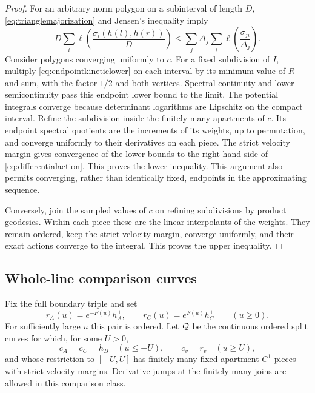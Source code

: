 \begin{proof}
For an arbitrary norm polygon on a subinterval of length $D$,
\eqref{eq:trianglemajorization} and Jensen's inequality imply
\begin{equation}\label{eq:endpointkineticlower}
 D\sum_i\ell\left(\frac{\sigma_i(h(l),h(r))}{D}\right)
 \le\sum_j\Delta_j\sum_i\ell\left(\frac{\sigma_{ji}}{\Delta_j}\right).
\end{equation}
Consider polygons converging uniformly to $c$. For a fixed subdivision
of $I$, multiply \eqref{eq:endpointkineticlower} on each interval by
its minimum value of $R$ and sum, with the factor $1/2$ and both
vertices. Spectral continuity and lower semicontinuity pass this
endpoint lower bound to the limit. The potential integrals converge
because determinant logarithms are Lipschitz on the compact interval.
Refine the subdivision inside the finitely many apartments of $c$.
Its endpoint spectral quotients are the increments of its weights,
up to permutation, and converge uniformly to their derivatives on
each piece. The strict velocity margin gives convergence of the
lower bounds to the right-hand side of \eqref{eq:differentialaction}.
This proves the lower inequality. This argument also permits converging,
rather than identically fixed, endpoints in the approximating sequence.

Conversely, join the sampled values of $c$ on refining subdivisions
by product geodesics. Within each piece these are the linear
interpolants of the weights. They remain ordered, keep the strict
velocity margin, converge uniformly, and their exact actions converge
to the integral. This proves the upper inequality.
\end{proof}

\subsection{Whole-line comparison curves}
Fix the full boundary triple and set
\[
 r_A(u)=e^{-F(u)}h_A^+,\qquad r_C(u)=e^{F(u)}h_C^+\qquad(u\ge0).
\]
For sufficiently large $u$ this pair is ordered. Let $\mathcal Q$ be the
continuous ordered split curves for which, for some $U>0$,
\begin{equation}\label{eq:exactreferencetails}
 c_A=c_C=h_B\quad(u\le-U),\qquad c_v=r_v\quad(u\ge U),
\end{equation}
and whose restriction to $[-U,U]$ has finitely many fixed-apartment
$C^1$ pieces with strict velocity margins. Derivative jumps at the
finitely many joins are allowed in this comparison class.

